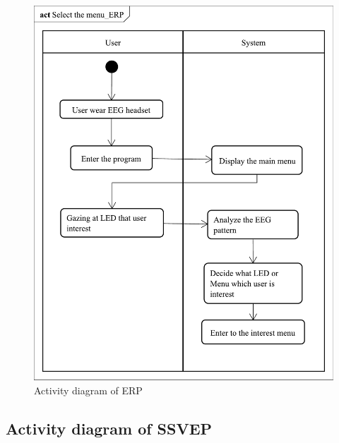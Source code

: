 \begin{figure}[ht]
\centering \includegraphics[scale=0.295]{chapter4/av_ERP.pdf}
\caption{Activity diagram of ERP}
\end{figure}


\newpage{}


\subsection{Activity diagram of SSVEP}

